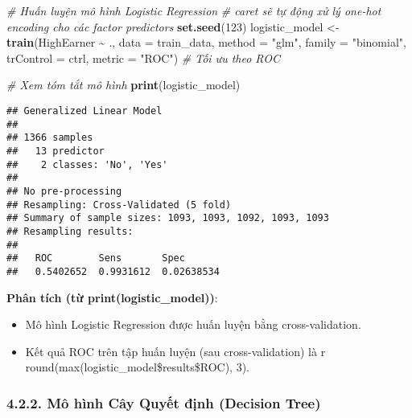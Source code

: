 \documentclass[
]{article}
\newenvironment{Shaded}{\begin{snugshade}}{\end{snugshade}}
\newcommand{\AttributeTok}[1]{\textcolor[rgb]{0.13,0.29,0.53}{#1}}
\newcommand{\CommentTok}[1]{\textcolor[rgb]{0.56,0.35,0.01}{\textit{#1}}}
\newcommand{\DecValTok}[1]{\textcolor[rgb]{0.00,0.00,0.81}{#1}}
\newcommand{\FunctionTok}[1]{\textcolor[rgb]{0.13,0.29,0.53}{\textbf{#1}}}
\newcommand{\NormalTok}[1]{#1}
\newcommand{\OtherTok}[1]{\textcolor[rgb]{0.56,0.35,0.01}{#1}}
\newcommand{\SpecialCharTok}[1]{\textcolor[rgb]{0.81,0.36,0.00}{\textbf{#1}}}
\newcommand{\StringTok}[1]{\textcolor[rgb]{0.31,0.60,0.02}{#1}}
\begin{document}
\begin{Shaded}
\begin{Highlighting}[]
\CommentTok{\# Huấn luyện mô hình Logistic Regression}
\CommentTok{\# caret sẽ tự động xử lý one{-}hot encoding cho các factor predictors}
\FunctionTok{set.seed}\NormalTok{(}\DecValTok{123}\NormalTok{)}
\NormalTok{logistic\_model }\OtherTok{\textless{}{-}} \FunctionTok{train}\NormalTok{(HighEarner }\SpecialCharTok{\textasciitilde{}}\NormalTok{ ., }
                        \AttributeTok{data =}\NormalTok{ train\_data, }
                        \AttributeTok{method =} \StringTok{"glm"}\NormalTok{, }
                        \AttributeTok{family =} \StringTok{"binomial"}\NormalTok{, }
                        \AttributeTok{trControl =}\NormalTok{ ctrl,}
                        \AttributeTok{metric =} \StringTok{"ROC"}\NormalTok{) }\CommentTok{\# Tối ưu theo ROC}

\CommentTok{\# Xem tóm tắt mô hình}
\FunctionTok{print}\NormalTok{(logistic\_model)}
\end{Highlighting}
\end{Shaded}

\begin{verbatim}
## Generalized Linear Model 
## 
## 1366 samples
##   13 predictor
##    2 classes: 'No', 'Yes' 
## 
## No pre-processing
## Resampling: Cross-Validated (5 fold) 
## Summary of sample sizes: 1093, 1093, 1092, 1093, 1093 
## Resampling results:
## 
##   ROC        Sens       Spec      
##   0.5402652  0.9931612  0.02638534
\end{verbatim}

\begin{Shaded}
\end{Shaded}

\textbf{Phân tích (từ print(logistic\_model))}:

\begin{itemize}
\item
  Mô hình Logistic Regression được huấn luyện bằng cross-validation.
\item
  Kết quả ROC trên tập huấn luyện (sau cross-validation) là r
  round(max(logistic\_model\$results\$ROC), 3).
\end{itemize}

\subsubsection{4.2.2. Mô hình Cây Quyết định (Decision
Tree)}\label{muxf4-huxecnh-cuxe2y-quyux1ebft-ux111ux1ecbnh-decision-tree}
\end{document}
